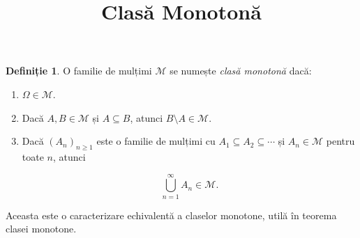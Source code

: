 \documentclass[12pt]{article}
\title{Clasă Monotonă}
\author{}
\date{}
\theoremstyle{definition}
\newtheorem{definition}{Definiție}
\begin{document}
\maketitle

\begin{definition}
O familie de mulțimi $\mathcal{M}$ se numește \emph{clasă monotonă} dacă:
\begin{enumerate}
    \item $\Omega \in \mathcal{M}$.
    \item Dacă $A, B \in \mathcal{M}$ și $A \subseteq B$, atunci $B \setminus A \in \mathcal{M}$.
    \item Dacă $(A_n)_{n \ge 1}$ este o familie de mulțimi cu $A_1 \subseteq A_2 \subseteq \cdots$ și $A_n \in \mathcal{M}$ pentru toate $n$, atunci
    

\[
        \bigcup_{n=1}^{\infty} A_n \in \mathcal{M}.
    \]


\end{enumerate}
\end{definition}

\noindent
Aceasta este o caracterizare echivalentă a claselor monotone, utilă în teorema clasei monotone.
\end{document}
